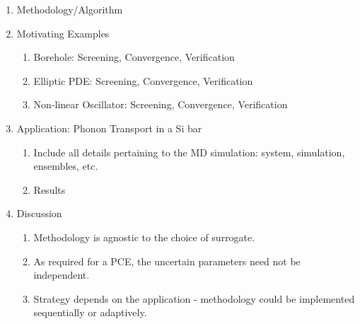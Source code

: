 \documentclass[letter,12pt]{article}
\begin{document}
\begin{enumerate}
\item Methodology/Algorithm

\item Motivating Examples
\begin{enumerate}
\item Borehole: Screening, Convergence, Verification
\item Elliptic PDE: Screening, Convergence, Verification
\item Non-linear Oscillator: Screening, Convergence, Verification
\end{enumerate}

\item Application: Phonon Transport in a Si bar
\begin{enumerate}
\item Include all details pertaining to the MD simulation: system, simulation, 
ensembles, etc. 
\item Results
\end{enumerate}

\item Discussion
\begin{enumerate}
\item Methodology is agnostic to the choice of surrogate.
\item As required for a PCE, the uncertain parameters need not be independent. 
\item Strategy depends on the application - methodology could be implemented 
sequentially or adaptively. 
\end{enumerate}

\end{enumerate}
\end{document}
